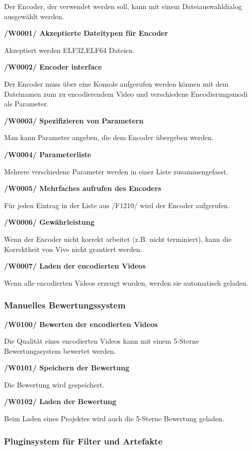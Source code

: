\documentclass[parskip=full]{scrartcl}
\begin{document}
Der Encoder, der verwendet werden soll, kann mit einem Dateiauswahldialog ausgewählt werden.

\textbf{/W0001/ Akzeptierte Dateitypen für Encoder}

Akzeptiert werden ELF32,ELF64 Dateien.

\newpage
\textbf{/W0002/ Encoder interface}

Der Encoder muss über eine Konsole aufgerufen werden können mit dem Dateinamen zum zu encodierendem Video und verschiedene Encodierungsmodi als Parameter.

\textbf{/W0003/ Spezifizieren von Parametern}

Man kann Parameter angeben, die dem Encoder übergeben werden.

\textbf{/W0004/ Parameterliste}

Mehrere verschiedene Parameter werden in einer Liste zusammengefasst.

\textbf{/W0005/ Mehrfaches aufrufen des Encoders}

Für jeden Eintrag in der Liste aus /F1210/ wird der Encoder aufgerufen.

\textbf{/W0006/ Gewährleistung}

Wenn der Encoder nicht korrekt arbeitet (z.B. nicht terminiert), kann die Korrektheit von Vive nicht grantiert werden.

\textbf{/W0007/ Laden der encodierten Videos}

Wenn alle encodierten Videos erzeugt wurden, werden sie automatisch geladen.

\subsubsection{Manuelles Bewertungssystem}
\textbf{/W0100/ Bewerten der encodierten Videos}

Die Qualität eines encodierten Videos kann mit einem 5-Sterne Bewertungssystem bewertet werden.

\textbf{/W0101/ Speichern der Bewertung}

Die Bewertung wird gespeichert.

\textbf{/W0102/ Laden der Bewertung}

Beim Laden eines Projektes wird auch die 5-Sterne Bewertung geladen.


\subsubsection{Pluginsystem für Filter und Artefakte}
\end{document}
